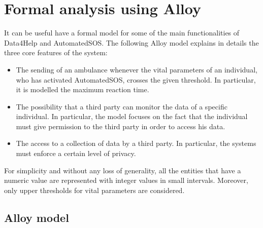 \chapter{Formal analysis using Alloy}
It can be useful have a formal model for some of the main functionalities of Data4Help and AutomatedSOS. The following Alloy model explains in details the three core features of the system:

\begin{itemize}
\item The sending of an ambulance whenever the vital parameters of an individual, who has activated AutomatedSOS, crosses the given threshold. In particular, it is modelled the maximum reaction time.
\item The possibility that a third party can monitor the data of a specific individual. In particular, the model focuses on the fact that the individual must give permission to the third party in order to access his data.
\item The access to a collection of data by a third party. In particular, the systems must enforce a certain level of privacy.
\end{itemize}
For simplicity and without any loss of generality, all the entities that have a numeric value are represented with integer values in small intervals. Moreover, only upper thresholds for vital parameters are considered.

\section{Alloy model}




